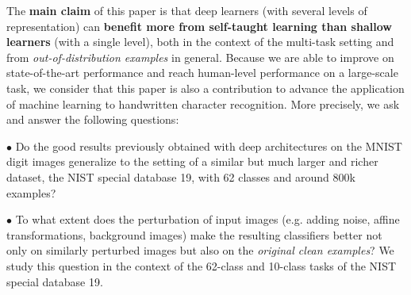 \documentclass{article} %
\begin{document}

%
The {\bf main claim} of this paper is that deep learners (with several levels of representation) can
{\bf benefit more from self-taught learning than shallow learners} (with a single
level), both in the context of the multi-task setting and from {\em
  out-of-distribution examples} in general. Because we are able to improve on state-of-the-art
performance and reach human-level performance
on a large-scale task, we consider that this paper is also a contribution
to advance the application of machine learning to handwritten character recognition.
More precisely, we ask and answer the following questions:

$\bullet$ %
Do the good results previously obtained with deep architectures on the
MNIST digit images generalize to the setting of a similar but much larger and richer
dataset, the NIST special database 19, with 62 classes and around 800k examples?

$\bullet$ %
To what extent does the perturbation of input images (e.g. adding
noise, affine transformations, background images) make the resulting
classifiers better not only on similarly perturbed images but also on
the {\em original clean examples}? We study this question in the
context of the 62-class and 10-class tasks of the NIST special database 19.
\end{document}
